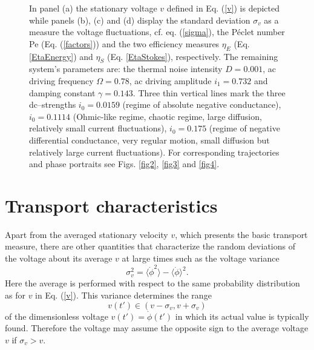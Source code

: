 \documentclass[a4,twocolumn,showpacs,showkeys]{revtex4}
\def\be{\begin{equation}}
\def\ee#1{\label{#1}\end{equation}}
\def\la{\langle}
\def\ra{\rangle}
\begin{document}
\begin{figure}
{In panel (a) the stationary voltage $v$ defined in Eq. (\ref{v}) is
depicted while panels (b), (c) and (d) display the standard deviation
$\sigma_v$ as a measure the voltage fluctuations, cf. eq. (\ref{sigma}),
the P\'eclet number  Pe  (Eq. (\ref{factors})) 
and the two efficiency measures
$\eta_{E}$ (Eq. \ref{EtaEnergy}) and $\eta_{S}$  (Eq. \ref{EtaStokes}), respectively. 
The remaining system's  parameters are: the thermal noise intensity $D=0.001$, ac driving
  frequency $\Omega=0.78$, ac driving amplitude $i_1=0.732$ and
  damping constant $\gamma=0.143$.  Three thin vertical lines 
  mark the three dc--strengths 
  $i_0=0.0159$ (regime of absolute negative conductance), $i_0=0.1114$
  (Ohmic-like regime, chaotic regime, large diffusion, relatively
  small current fluctuations), $i_0=0.175$ (regime of negative
  differential conductance, very regular motion, small diffusion but
  relatively large current fluctuations). For corresponding trajectories
  and phase portraits see Figs. \ref{fig2}, \ref{fig3} and
  \ref{fig4}.  }
\label{fig1}
\end{figure}

\section{Transport characteristics} 

Apart from the averaged stationary velocity $v$, which presents the basic 
transport measure, there are other quantities that characterize the random
deviations of the voltage about its average $v$ at large times such as
the voltage variance 
\be
\sigma_v^2 = \la \dot\phi^2 \ra -\la \dot\phi \ra^2.
\ee{sigma}
Here
the average is performed with respect to the same probability
distribution as for $v$ in Eq. (\ref{v}).
This variance determines the range  
%
\be
v(t') \in \left( v  -\sigma_v,  v+\sigma_v\right)
\ee{v(t)}
% 
of the 
dimensionless voltage $v(t')=\dot{\phi}(t')$  in which its actual value is
typically found.
Therefore the voltage may assume the opposite
sign to  the average voltage $v$ if $\sigma_v > v $.
\end{document}
